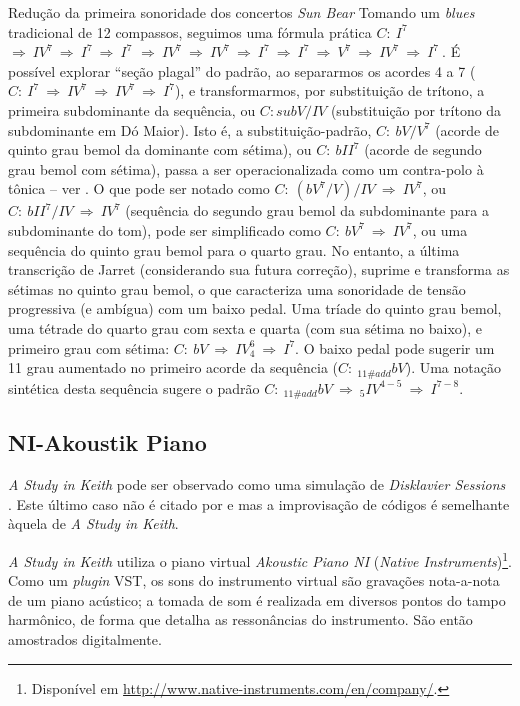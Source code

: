 \begin{example}{Redução da primeira sonoridade dos concertos \emph{Sun Bear}}
Tomando um \emph{blues} tradicional de 12 compassos, seguimos uma fórmula prática $C:~I^7~$ $\Rightarrow~IV^7~\Rightarrow~I^7~\Rightarrow~I^7$ $\Rightarrow~IV^7~\Rightarrow~IV^7~\Rightarrow~I^7~\Rightarrow~I^7~\Rightarrow~V^7~\Rightarrow~IV^7~\Rightarrow~I^7~$. É possível explorar ``seção plagal'' do padrão, ao separarmos os acordes 4 a 7 ($C:~I^7~\Rightarrow~IV^7~\Rightarrow~IV^7~\Rightarrow~I^7$), e transformarmos, por substituição de trítono, a primeira subdominante da sequência, ou $C: subV/IV$ (substituição por trítono da subdominante em Dó Maior). Isto é, a substituição-padrão, $C:~bV/V^7$ (acorde de quinto grau bemol da dominante com sétima), ou $C:~bII^7$ (acorde de segundo grau bemol com sétima), passa a ser operacionalizada como um contra-polo à tônica -- ver \cite{soares_luteria_2015}.  O que pode ser notado como $C:~(bV^7/V)/IV~\Rightarrow~IV^7$, ou $C:~bII^7/IV~\Rightarrow~IV^7$ (sequência do segundo grau bemol da subdominante para a subdominante do tom), pode ser simplificado como $C:~bV^7~\Rightarrow~IV^7$, ou uma sequência do quinto grau bemol para o quarto grau.  No entanto, a última transcrição de Jarret (considerando sua futura correção), suprime e transforma as sétimas no quinto grau bemol, o que caracteriza uma sonoridade de tensão progressiva (e ambígua) com um baixo pedal. Uma tríade do quinto grau bemol, uma tétrade do quarto grau com sexta e quarta (com sua sétima no baixo), e primeiro grau com sétima:  $C:~bV~\Rightarrow~IV^6_{4}~\Rightarrow~I^7$. O baixo pedal pode sugerir um 11 grau aumentado no primeiro acorde da sequência ($C:~_{11\#add}bV$). Uma notação sintética desta sequência sugere o padrão  $C:~_{11\#add}bV~\Rightarrow~_{5}IV^{4-5}~\Rightarrow~I^{7-8}$.
\centering{}
\end{example}


\subsection{NI-Akoustik Piano}\label{sec:NI}

\emph{A Study in Keith} pode ser observado como uma simulação de \emph{Disklavier Sessions} . Este último caso não é citado por   e  mas a improvisação de códigos é semelhante àquela de \emph{A Study in Keith}.

\emph{A Study in Keith} utiliza o piano virtual \emph{Akoustic Piano NI} (\emph{Native Instruments})\footnote{Disponível em \url{http://www.native-instruments.com/en/company/}.}. Como um \emph{plugin} VST, os sons do instrumento virtual são gravações nota-a-nota de um piano acústico; a tomada de som é realizada em diversos pontos do tampo harmônico, de forma que detalha as ressonâncias do instrumento. São então amostrados digitalmente.

